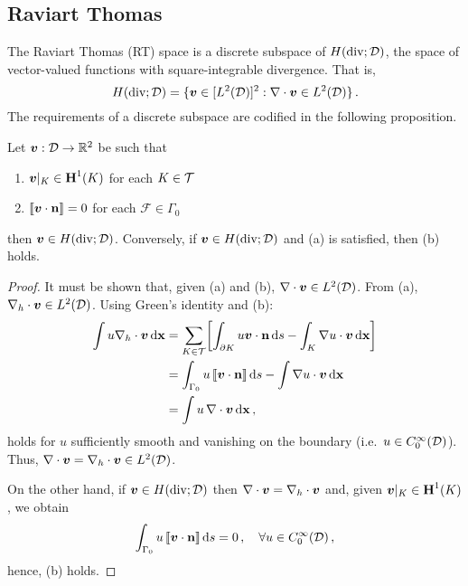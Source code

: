 \documentclass[../doc.tex]{subfiles}
\begin{document}
\subsection{Raviart Thomas} \label{fem_sec:fes_rt}
The Raviart Thomas (RT) space is a discrete subspace of $H(\operatorname{div};\mathcal{D})$, the space of vector-valued functions with square-integrable divergence. That is, 
	\begin{equation}
		H(\operatorname{div};\mathcal{D}) = \{ \boldsymbol{v} \in [L^2(\mathcal{D})]^2 : \nabla\cdot\boldsymbol{v} \in L^2(\mathcal{D}) \} \,. 
	\end{equation}
The requirements of a discrete subspace are codified in the following proposition. 
\begin{prop} \label{prop:div}
Let $\boldsymbol{v} : \mathcal{D} \rightarrow \mathbb{R}^2$ be such that 
\begin{enumerate}
	\item $\boldsymbol{v}|_K \in \boldsymbol{\mathrm{H}}^1(K)$ for each $K \in \mathcal{T}$  
	\item $\left\llbracket\boldsymbol{v}\cdot\boldsymbol{\mathrm{n}} \right\rrbracket = 0$ for each $\mathcal{F} \in \Gamma_0$ 
\end{enumerate}
then $\boldsymbol{v} \in H(\operatorname{div};\mathcal{D})$. Conversely, if $\boldsymbol{v} \in H(\operatorname{div};\mathcal{D})$ and (a) is satisfied, then (b) holds. 
\end{prop}
\begin{proof}
It must be shown that, given (a) and (b), $\nabla\cdot\boldsymbol{v} \in L^2(\mathcal{D})$. From (a), $\nabla_h\cdot\boldsymbol{v} \in L^2(\mathcal{D})$. Using Green's identity and (b): 
	\begin{equation}
	\begin{aligned}
		\int u\nabla_h\cdot\boldsymbol{v} \mathop{}\!\mathrm{d} \boldsymbol{\mathrm{x}} &= \sum_{K\in\mathcal{T}} \!\left[ \int_{\partial K} u \boldsymbol{v}\cdot\boldsymbol{\mathrm{n}} \mathop{}\!\mathrm{d} s - \int_K \nabla u \cdot \boldsymbol{v} \mathop{}\!\mathrm{d} \boldsymbol{\mathrm{x}}  \right] \\
		&= \int_{\Gamma_0} u \left\llbracket\boldsymbol{v}\cdot\boldsymbol{\mathrm{n}} \right\rrbracket \mathop{}\!\mathrm{d} s - \int \nabla u \cdot \boldsymbol{v} \mathop{}\!\mathrm{d} \boldsymbol{\mathrm{x}} \\
		&= \int u\, \nabla\cdot\boldsymbol{v} \mathop{}\!\mathrm{d} \boldsymbol{\mathrm{x}} \,, 
	\end{aligned}
	\end{equation}
holds for $u$ sufficiently smooth and vanishing on the boundary (i.e.~$u \in C_0^\infty(\mathcal{D})$). Thus, $\nabla\cdot\boldsymbol{v} = \nabla_h\cdot\boldsymbol{v} \in L^2(\mathcal{D})$. 

On the other hand, if $\boldsymbol{v} \in H(\operatorname{div};\mathcal{D})$ then $\nabla\cdot\boldsymbol{v} = \nabla_h\cdot\boldsymbol{v}$ and, given $\boldsymbol{v}|_K \in \boldsymbol{\mathrm{H}}^1(K)$, we obtain 
	\begin{equation}
		\int_{\Gamma_0} u \left\llbracket\boldsymbol{v}\cdot\boldsymbol{\mathrm{n}} \right\rrbracket \mathop{}\!\mathrm{d} s = 0 \,, \quad \forall u \in C_0^\infty(\mathcal{D}) \,, 
	\end{equation}
hence, (b) holds.
\end{proof}
\end{document}
